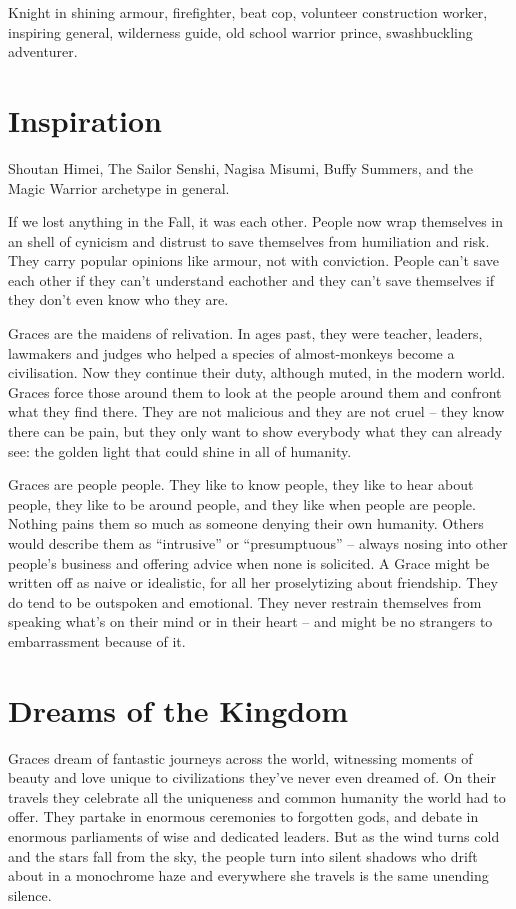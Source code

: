 Knight in shining armour, firefighter, beat cop, volunteer construction worker, inspiring general, wilderness guide, old school warrior prince, swashbuckling adventurer. 

\section*{Inspiration}
Shoutan Himei, The Sailor Senshi, Nagisa Misumi, Buffy Summers, and the Magic Warrior archetype in general. 

\newpage{}

If we lost anything in the Fall, it was each other. People now wrap themselves in an shell of cynicism and distrust to save themselves from humiliation and risk. They carry popular opinions like armour, not with conviction. People can't save each other if they can't understand eachother and they can't save themselves if they don't even know who they are.

Graces are the maidens of relivation. In ages past, they were teacher, leaders, lawmakers and judges who helped a species of almost-monkeys become a civilisation. Now they continue their duty, although muted, in the modern world. Graces force those around them to look at the people around them and confront what they find there. They are not malicious and they are not cruel – they know there can be pain, but they only want to show everybody what they can already see: the golden light that could shine in all of humanity.

Graces are people people. They like to know people, they like to hear about people, they like to be around people, and they like when people are people. Nothing pains them so much as someone denying their own humanity. Others would describe them as “intrusive” or “presumptuous” – always nosing into other people's business and offering advice when none is solicited. A Grace might be written off as naive or idealistic, for all her proselytizing about friendship. They do tend to be outspoken and emotional. They never restrain themselves from speaking what's on their mind or in their heart – and might be no strangers to embarrassment because of it. 

\section*{Dreams of the Kingdom}
Graces dream of fantastic journeys across the world, witnessing moments of beauty and love unique to civilizations they've never even dreamed of. On their travels they celebrate all the uniqueness and common humanity the world had to offer. They partake in enormous ceremonies to forgotten gods, and debate in enormous parliaments of wise and dedicated leaders. But as the wind turns cold and the stars fall from the sky, the people turn into silent shadows who drift about in a monochrome haze and everywhere she travels is the same unending silence. 


